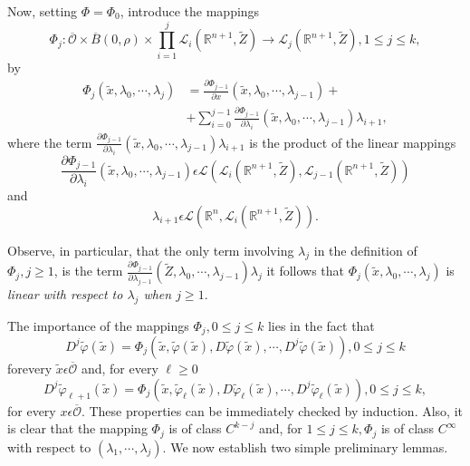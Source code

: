 Now, setting $\Phi = \Phi_{0}$, introduce the mappings
$$
\Phi_{j} : \overline{\mathscr{O}} \times \overline{B}(0, \rho) \times
\prod_{i=1}^{j} \mathscr{L}_{i} (\mathbb{R}^{n+1}, \widetilde{Z}) \to
\mathscr{L}_{j}(\mathbb{R}^{n+1}, \widetilde{Z}), 1 \leq j \leq k,
$$
by 
\begin{align*}
\Phi_{j} (\widetilde{x}, \lambda_{0}, \cdots, \lambda_{j}) & =
\frac{\partial \Phi_{j-1}}{\partial x} (\widetilde{x}, \lambda_{0},
\cdots, \lambda_{j-1}) + \tag{A2.28} \label{app-2-eqA2.28}\\
& + \sum\limits_{i=0}^{j-1} \frac{\partial \Phi_{j-1}}{\partial
  \lambda_{i}} (\widetilde{x}, \lambda_{0}, \cdots, \lambda_{j-1}) \lambda_{i+1},
\end{align*}
where the term $\frac{\partial \Phi_{j-1}}{\partial \lambda_{i}}
(\widetilde{x}, \lambda_{0}, \cdots, \lambda_{j-1}) \lambda_{i+1}$ is
the product of the linear mappings 
$$\frac{\partial
  \Phi_{j-1}}{\partial \lambda_{i}} (\widetilde{x}, \lambda_{0},
\cdots, \lambda_{j-1}) \epsilon \mathscr{L}
(\mathscr{L}_{i}(\mathbb{R}^{n+1}, \widetilde{Z}), \mathscr{L}_{j-1}
(\mathbb{R}^{n+1}, \widetilde{Z}))$$ and 
$$\lambda_{i+1} \epsilon
\mathscr{L} (\mathbb{R}^{n}, \mathscr{L}_{i}(\mathbb{R}^{n+1}, \widetilde{Z})).$$

\begin{alphrem}\label{app-2-remA2.1}%
Observe, in particular, that the only term involving $\lambda_{j}$ in
the definition of $\Phi_{j}, j \geq 1$, is the term $\frac{\partial
  \Phi_{j-1}}{\partial \lambda_{j-1}} (\widetilde{Z}, \lambda_{0},
\cdots, \lambda_{j-1}) \lambda_{j} $ it follows that $\Phi_{j}
(\widetilde{x}, \lambda_{0}, \cdots, \lambda_{j})$ is {\em linear with
respect to $\lambda_{j}$ when $j \geq 1$}.
\end{alphrem}

The importance of the mappings $\Phi_{j}, 0 \leq j \leq k$ lies in the
fact that
\begin{equation*}
D^{j}\widetilde{\varphi}(\widetilde{x}) = \Phi_{j}(\widetilde{x},
\widetilde{\varphi}(\widetilde{x}),
D\widetilde{\varphi}(\widetilde{x}), \cdots,
D^{j}\widetilde{\varphi}(\widetilde{x})), 0 \leq j \leq k\tag{A2.29} \label{app-2-eqA2.29}
\end{equation*}
for\pageoriginale every $\widetilde{x} \epsilon
\overline{\mathscr{O}}$ and, for every $\ell \geq 0$
\begin{equation*}
D^{j}\widetilde{\varphi}_{\ell + 1}(\widetilde{x}) =
\Phi_{j}(\widetilde{x}, \widetilde{\varphi}_{\ell}(\widetilde{x}),
D\widetilde{\varphi}_{\ell}(\widetilde{x}), \cdots,
D^{j}\widetilde{\varphi}_{\ell}(\widetilde{x})), 0 \leq j \leq k,\tag{A2.30}\label{app-2-eqA2.30}
\end{equation*}
for every $x \epsilon \overline{\mathscr{O}}$. These properties can be
immediately checked by induction. Also, it is clear that the mapping
$\Phi_{j}$ is of class $C^{k-j}$ and, for $1 \leq j \leq k, \Phi_{j}$
is of class $C^{\infty}$ with respect to $(\lambda_{1}, \cdots,
\lambda_{j})$. We now establish two simple preliminary lemmas.

